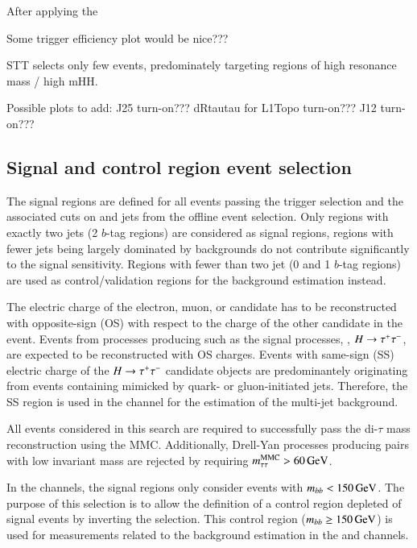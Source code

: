 After applying the

Some trigger efficiency plot would be nice???

STT selects only few events, predominately targeting regions of high resonance mass / high mHH.

Possible plots to add:
J25 turn-on???
dRtautau for L1Topo turn-on???
J12 turn-on???

\subsection{Signal and control region event selection}%
\label{sec:sr_and_cr_selection}

The signal regions are defined for all events passing the trigger
selection and the associated cuts on \tauhadvis and jets from the
offline event selection. Only regions with exactly two \btagged jets
(2 $b$-tag regions) are considered as signal regions, regions with
fewer \btagged jets being largely dominated by backgrounds do not
contribute significantly to the signal sensitivity. Regions with fewer
than two \btagged jet (0 and 1 $b$-tag regions) are used as
control/validation regions for the background estimation instead.

The electric charge of the electron, muon, or \tauhadvis candidate has
to be reconstructed with opposite-sign (OS) with respect to the charge
of the other \tauhadvis candidate in the event. Events from processes
producing \tauleptons such as the signal processes, \Zjets,
$H \to \tau^{+} \tau^{-}$, \ttbar are expected to be reconstructed with OS
charges. Events with same-sign (SS) electric charge of the
$H \to \tau^{+} \tau^{-}$ candidate objects are predominantely originating from
events containing \tauhadvis mimicked by quark- or gluon-initiated
jets. Therefore, the SS region is used in the \hadhad channel for the
estimation of the multi-jet background.

All events considered in this search are required to successfully pass
the di-$\tau$ mass reconstruction using the MMC. Additionally,
Drell-Yan processes producing \taulepton pairs with low invariant mass
are rejected by requiring $m_{\tau\tau}^\text{MMC} > \SI{60}{\ensuremath{\text{GeV}}}$.

In the \lephad channels, the signal regions only consider events with
$m_{bb} < \SI{150}{\ensuremath{\text{GeV}}}$. The purpose of this selection is to allow the
definition of a \ttbar control region depleted of signal events by
inverting the selection. This control region
($m_{bb} \geq \SI{150}{\ensuremath{\text{GeV}}}$) is used for measurements related to the
\faketauhadvis background estimation in the \lephad and \hadhad
channels.

